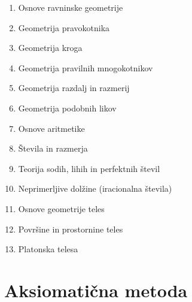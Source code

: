     \begin{enumerate}[label=\Roman*. knjiga]
        \item Osnove ravninske geometrije
        \item Geometrija pravokotnika
        \item Geometrija kroga
        \item Geometrija pravilnih mnogokotnikov
        \item Geometrija razdalj in razmerij
        \item Geometrija podobnih likov
        \item Osnove aritmetike
        \item Števila in razmerja
        \item Teorija sodih, lihih in perfektnih števil
        \item Neprimerljive dolžine (iracionalna števila)
        \item Osnove geometrije teles
        \item Površine in prostornine teles
        \item Platonska telesa
    \end{enumerate}

\section{Aksiomatična metoda}

